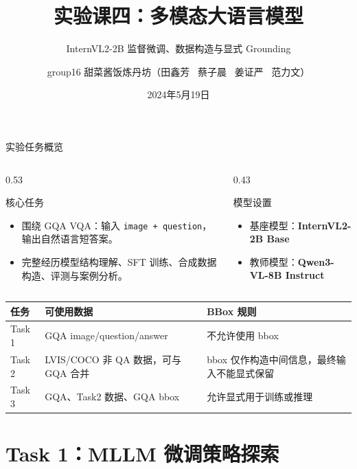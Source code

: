 \documentclass{beamer}
\title{实验课四：多模态大语言模型}
\subtitle{InternVL2-2B 监督微调、数据构造与显式 Grounding}
\author{group16 甜菜酱饭炼丹坊（田鑫芳 \ 蔡子晨 \ 姜证严 \ 范力文）}
\date{2024年5月19日}
\newcommand{\smalltab}{\scriptsize}
\begin{document}
\maketitle

\begin{frame}{实验任务概览}
\small
\begin{columns}[T,onlytextwidth]
\begin{column}{0.53\textwidth}
\begin{block}{核心任务}
\begin{itemize}
\item 围绕 GQA VQA：输入 \texttt{image + question}，输出自然语言短答案。
\item 完整经历模型结构理解、SFT 训练、合成数据构造、评测与案例分析。
\end{itemize}
\end{block}
\end{column}
\begin{column}{0.43\textwidth}
\begin{block}{模型设置}
\begin{itemize}
\item 基座模型：\textbf{InternVL2-2B Base}
\item 教师模型：\textbf{Qwen3-VL-8B Instruct}
\end{itemize}
\end{block}
\end{column}
\end{columns}
\vspace{0.3em}
\begin{center}
\smalltab
\begin{tabular}{p{}p{}p{}}
\toprule
任务 & 可使用数据 & BBox 规则 \\
\midrule
Task 1 & GQA image/question/answer & 不允许使用 bbox \\
Task 2 & LVIS/COCO 非 QA 数据，可与 GQA 合并 & bbox 仅作构造中间信息，最终输入不能显式保留 \\
Task 3 & GQA、Task2 数据、GQA bbox & 允许显式用于训练或推理 \\
\bottomrule
\end{tabular}
\end{center}
\end{frame}

\section{Task 1：MLLM 微调策略探索}
\end{document}
